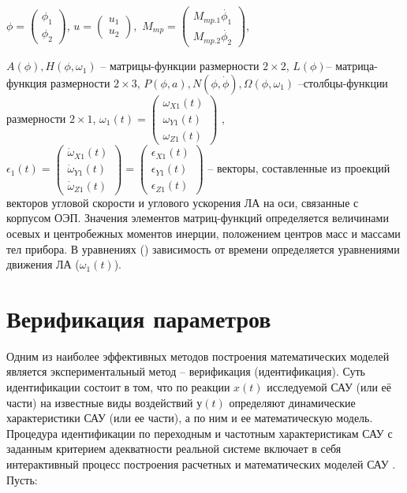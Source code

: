 $\phi{}=\left(\begin{array}{
	cc}
{\phi{}}_1 \\
{\phi{}}_2
\end{array}\right)$, $u=\left(\begin{array}{
	cc}
u_1 \\
u_2
\end{array}\right),$ $M_{mp}=\left(\begin{array}{
	cc}
M_{\textit{mp.1}} \dot{\phi_1} \\
M_{\textit{mp.2}} \dot{\phi_2}
\end{array}\right)$,

$A\left(\phi{}\right),H\left(\phi{},{\omega{}}_1\right)$ – матрицы-функции размерности $2 \times 2$, $L(\phi)$– матрица-функция размерности $2 \times 3$,
$P\left(\phi{},a\right),N\left(\phi{},\dot{\phi{}}\right),\Omega{}\left(\phi{},{\omega{}}_1\right)$ –столбцы-функции размерности $2 \times 1$,
${\omega{}}_1(t)=\left(\begin{array}{
	ccc}
{\omega{}}_{X1}(t) \\
{\omega{}}_{Y1}(t) \\
{\omega{}}_{Z1}(t)
\end{array}\right)$
, ${\epsilon{}}_1(t)=\left(\begin{array}{
	ccc}
{\dot{\omega{}}}_{X1}(t) \\
{\dot{\omega{}}}_{Y1}(t) \\
{\dot{\omega{}}}_{Z1}(t)
\end{array}\right)=\left(\begin{array}{
	ccc}
{\epsilon{}}_{X1}(t) \\
{\epsilon{}}_{Y1}(t) \\
{\epsilon{}}_{Z1}(t)
\end{array}\right)$
– векторы, составленные из проекций векторов угловой скорости и углового ускорения ЛА на оси, связанные с корпусом ОЭП. Значения элементов матриц-функций определяется величинами осевых и центробежных моментов инерции, положением центров масс и массами тел прибора. В уравнениях () зависимость от времени определяется уравнениями движения ЛА ($\omega_1(t)$).

\section{Верификация параметров} \label{sec:ch2/sec4}

Одним из наиболее эффективных методов построения математических моделей является экспериментальный метод – верификация (идентификация). Суть идентификации состоит в том, что по реакции $x(t)$ исследуемой САУ (или её части) на известные виды воздействий $у(t)$ определяют динамические характеристики САУ (или ее части), а по ним и ее математическую модель. Процедура идентификации по переходным и частотным характеристикам САУ с заданным критерием адекватности реальной системе включает в себя интерактивный процесс построения расчетных и математических моделей САУ \cite[]{Karpov}. Пусть:

